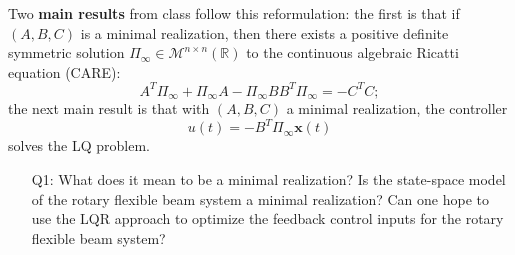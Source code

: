 Two \textbf{main results} from class follow this reformulation: the first is that if $(A,B,C)$ is a minimal realization, then there exists a positive definite symmetric solution $\Pi_{\infty} \in \mathcal{M}^{n \times n}(\mathbb{R})$ to the continuous algebraic Ricatti equation (CARE):
\[
    A^T \Pi_{\infty} + \Pi_{\infty} A - \Pi_{\infty} B B^T \Pi_{\infty} = -C^T C;
\]
the next main result is that with $(A,B,C)$ a minimal realization, the controller
\[
    u(t) = -B^T \Pi_{\infty} \mathbf{x}(t)
\]
solves the LQ problem.

\begin{enumerate}
    \item[Q1:] What does it mean to be a minimal realization? Is the state-space model of the rotary flexible beam system a minimal realization? Can one hope to use the LQR approach to optimize the feedback control inputs for the rotary flexible beam system?\\
\end{enumerate}


